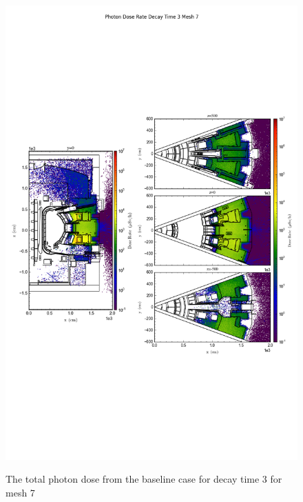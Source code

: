 \begin{figure}[ht!]
\centering
\includegraphics[trim={0cm 9cm 0cm 10cm},clip,scale=0.75]{../plots/final_model/Photon_Dose_Rate_Decay_Time_3_Mesh_7.png}
\label{fig:photons_dc3_no4bc_m7_flux}
\caption{The total photon dose from the baseline case for decay time 3 for mesh 7}
\end{figure}
